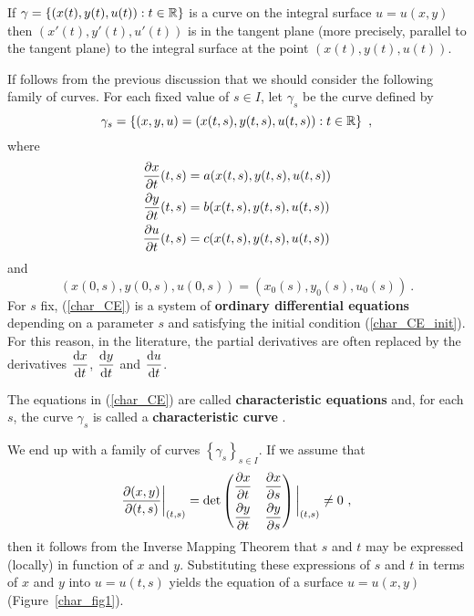 If $\displaystyle \gamma = \left\{ (x(t),y(t),u(t)) : t \in \mathbb{R} \right\}$
is a curve on the integral surface $u=u(x,y)$ then
$\left(x'(t),y'(t),u'(t)\right)$ is in the tangent
plane (more precisely, parallel to the tangent plane) to the integral
surface at the point $\left(x(t),y(t),u(t)\right)$.

If follows from the previous discussion that we should consider the
following family of curves.  For each fixed value of $s \in I$,
let $\gamma_s$ be the curve defined by
\[
\gamma_s = \left\{ (x,y,u) = \left(x(t,s), y(t,s), u(t,s) \right) : t \in \mathbb{R}
\right\} \ ,
\]
where
\begin{equation} \label{char_CE}
\begin{split}
\frac{\partial{x}}{\partial t}(t,s) &= a(x(t,s),y(t,s),u(t,s)) \\
\frac{\partial{y}}{\partial t}(t,s) &= b(x(t,s),y(t,s),u(t,s)) \\
\frac{\partial{u}}{\partial t}(t,s) &= c(x(t,s),y(t,s),u(t,s))
\end{split}
\end{equation}
and
\begin{equation} \label{char_CE_init}
\left(x(0,s), y(0,s), u(0,s)\right) =
\left(x_0(s), y_0(s), u_0(s)\right) \ .
\end{equation}
For $s$ fix, (\ref{char_CE}) is a system of {\bfseries ordinary
differential equations}
depending on a parameter $s$ and satisfying the initial condition
(\ref{char_CE_init}).  For this reason, in the literature, the partial
derivatives are often replaced by the derivatives
$\displaystyle \frac{\mathrm{d}x}{\mathrm{d}{t}}$, $\displaystyle \frac{\mathrm{d}y}{\mathrm{d}{t}}$ and
$\displaystyle \frac{\mathrm{d}u}{\mathrm{d}{t}}$.

\begin{defn}
The equations in (\ref{char_CE}) are called
{\bfseries characteristic equations}%
and, for each $s$, the curve $\gamma_s$ is called a
{\bfseries characteristic curve}%
.
\end{defn}

We end up with a family of curves
$\displaystyle \left\{ \gamma_s \right\}_{s\in I}$.  If we assume that
\begin{equation} \label{char_IFTQL_cond}
\frac{\partial(x,y)}{\partial(t,s)}\bigg|_{(t,s)} = \det
\begin{pmatrix}
\displaystyle \frac{\partial{x}}{\partial t} & \displaystyle \frac{\partial{x}}{\partial s} \\[0.7em]
\displaystyle \frac{\partial{y}}{\partial t} & \displaystyle \frac{\partial{y}}{\partial s}
\end{pmatrix}\bigg|_{(t,s)} \neq 0 \ ,
\end{equation}
then it follows from the Inverse Mapping Theorem that $s$ and $t$ may
be expressed (locally) in function of $x$ and $y$.  Substituting these
expressions of $s$ and $t$ in terms of $x$ and $y$ into $u=u(t,s)$
yields the equation of a surface $u=u(x,y)$ (Figure~\ref{char_fig1}).

